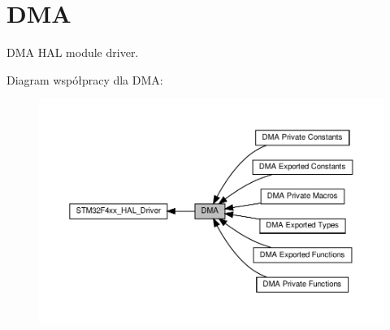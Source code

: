 \hypertarget{group___d_m_a}{}\section{D\+MA}
\label{group___d_m_a}


D\+MA H\+AL module driver.  


Diagram współpracy dla D\+MA\+:\nopagebreak
\begin{figure}[H]
\begin{center}
\leavevmode
\includegraphics[width=350pt]{group___d_m_a}
\end{center}
\end{figure}
